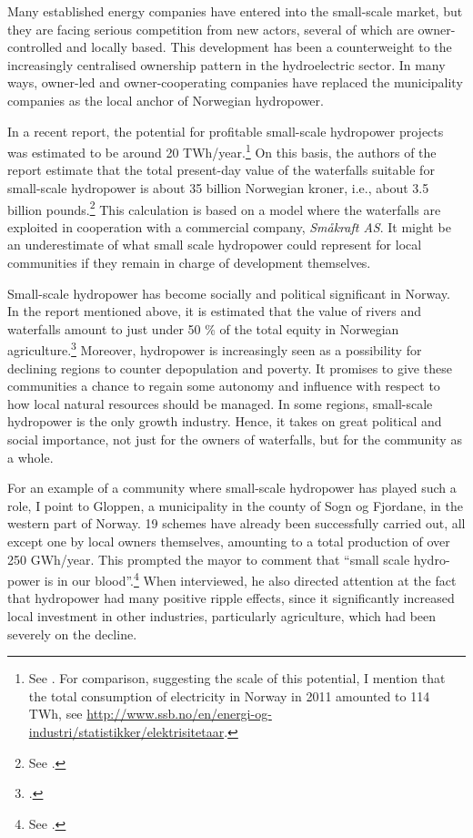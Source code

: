 Many established energy companies have entered into the small-scale market, but they are facing serious competition from new actors, several of which are  owner-controlled and locally based. This development has been a counterweight to the increasingly centralised ownership pattern in the hydroelectric sector. In many ways, owner-led and owner-cooperating companies have replaced the municipality companies as the local anchor of Norwegian hydropower.

In a recent report, the potential for profitable small-scale hydropower projects was estimated to be around 20 TWh/year.\footnote{See \cite{aanesland09}. For comparison, suggesting the scale of this potential, I mention that the total consumption of electricity in Norway in 2011 amounted to 114 TWh, see \url{http://www.ssb.no/en/energi-og-industri/statistikker/elektrisitetaar}.} On this basis, the authors of the report estimate that the total present-day value of the waterfalls suitable for small-scale hydropower is about 35 billion Norwegian kroner, i.e., about 3.5 billion pounds.\footnote{See \cite[1]{aanesland09}.} This calculation is based on a model where the waterfalls are exploited in cooperation with a commercial company, {\it Småkraft AS}. It might be an underestimate of what small scale hydropower could represent for local communities if they remain in charge of development themselves.

Small-scale hydropower has become socially and political significant in Norway. In the report mentioned above, it is estimated that the value of rivers and waterfalls amount to just under 50 \% of the total equity in Norwegian agriculture.\footcite[1]{aanesland09} Moreover, hydropower is increasingly seen as a possibility for declining regions to counter depopulation and poverty. It promises to give these communities a chance to regain some autonomy and influence with respect to how local natural resources should be managed. In some regions, small-scale hydropower is the only growth industry. Hence, it takes on great political and social importance, not just for the owners of waterfalls, but for the community as a whole.

For an example of a community where small-scale hydropower has played such a role, I point to Gloppen, a municipality in the county of Sogn og Fjordane, in the western part of Norway. 19 schemes have already been successfully carried out, all except one by local owners themselves, amounting to a total production of over 250 GWh/year. This prompted the mayor to comment that ``small scale hydro-power is in our blood''.\footnote{See \cite{starheim12}.} When interviewed, he also directed attention at the fact that hydropower had many positive ripple effects, since it significantly increased local investment in other industries, particularly agriculture, which had been severely on the decline.

